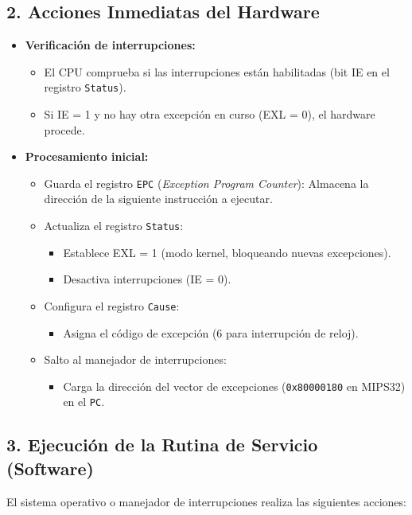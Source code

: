 \documentclass{article}
\begin{document}
\subsection*{2. Acciones Inmediatas del Hardware}
\begin{itemize}
    \item \textbf{Verificación de interrupciones:}
    \begin{itemize}
        \item El CPU comprueba si las interrupciones están habilitadas (bit IE en el registro \texttt{Status}).
        \item Si IE = 1 y no hay otra excepción en curso (EXL = 0), el hardware procede.
    \end{itemize}
    
    \item \textbf{Procesamiento inicial:}
    \begin{itemize}
        \item Guarda el registro \texttt{EPC} (\textit{Exception Program Counter}): Almacena la dirección de la siguiente instrucción a ejecutar.
        \item Actualiza el registro \texttt{Status}:
        \begin{itemize}
            \item Establece EXL = 1 (modo kernel, bloqueando nuevas excepciones).
            \item Desactiva interrupciones (IE = 0).
        \end{itemize}
        \item Configura el registro \texttt{Cause}:
        \begin{itemize}
            \item Asigna el código de excepción (6 para interrupción de reloj).
        \end{itemize}
        \item Salto al manejador de interrupciones:
        \begin{itemize}
            \item Carga la dirección del vector de excepciones (\texttt{0x80000180} en MIPS32) en el \texttt{PC}.
        \end{itemize}
    \end{itemize}
\end{itemize}

\subsection*{3. Ejecución de la Rutina de Servicio (Software)}
El sistema operativo o manejador de interrupciones realiza las siguientes acciones:
\end{document}
